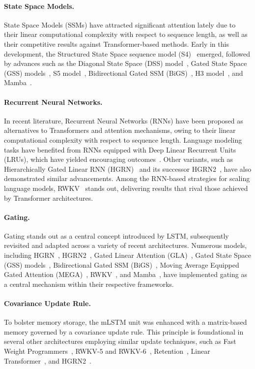\paragraph{State Space Models.} State Space Models (SSMs) have attracted significant attention lately due to their linear computational complexity with respect to sequence length, as well as their competitive results against Transformer-based methods. Early in this development, the Structured State Space sequence model (S4)~\citep{Gu:21} emerged, followed by advances such as the Diagonal State Space (DSS) model~\citep{Gupta:22}, Gated State Space (GSS) models~\citep{Mehta:22}, S5 model~\citep{Smith:22}, Bidirectional Gated SSM (BiGS)~\citep{Wang:22}, H3 model~\citep{Fu:23}, and Mamba~\citep{Gu:24arxiv}.

\paragraph{Recurrent Neural Networks.} In recent literature, Recurrent Neural Networks (RNNs) have been proposed as alternatives to Transformers and attention mechanisms, owing to their linear computational complexity with respect to sequence length. Language modeling tasks have benefited from RNNs equipped with Deep Linear Recurrent Units (LRUs), which have yielded encouraging outcomes~\citep{Orvieto:23, De:24arxiv}. Other variants, such as Hierarchically Gated Linear RNN (HGRN)~\citep{Qin:23} and its successor HGRN2~\citep{Qin:24arxiv}, have also demonstrated similar advancements. Among the RNN-based strategies for scaling language models, RWKV~\citep{Peng:23arxivshort,Peng:24arxivshort} stands out, delivering results that rival those achieved by Transformer architectures.

\paragraph{Gating.}
Gating stands out as a central concept introduced by LSTM, subsequently revisited and adapted across a variety of recent architectures. Numerous models, including HGRN~\citep{Qin:23}, HGRN2~\citep{Qin:24arxiv}, Gated Linear Attention (GLA)~\citep{Yang:23arxiv}, Gated State Space (GSS) models~\citep{Mehta:22}, Bidirectional Gated SSM (BiGS)~\citep{Wang:22}, Moving Average Equipped Gated Attention (MEGA)~\citep{Ma:22}, RWKV~\citep{Peng:23arxivshort}, and Mamba~\citep{Gu:24arxiv}, have implemented gating as a central mechanism within their respective frameworks.

\paragraph{Covariance Update Rule.} 
To bolster memory storage, the mLSTM unit was enhanced with a matrix-based memory governed by a covariance update rule. This principle is foundational in several other architectures employing similar update techniques, such as Fast Weight Programmers~\citep{Schmidhuber:92ncfastweights,Schlag:21}, RWKV-5 and RWKV-6~\citep{Peng:24arxivshort}, Retention~\citep{Sun:23arxiv}, Linear Transformer~\citep{Katharopoulos:20}, and HGRN2~\citep{Qin:24arxiv}.

